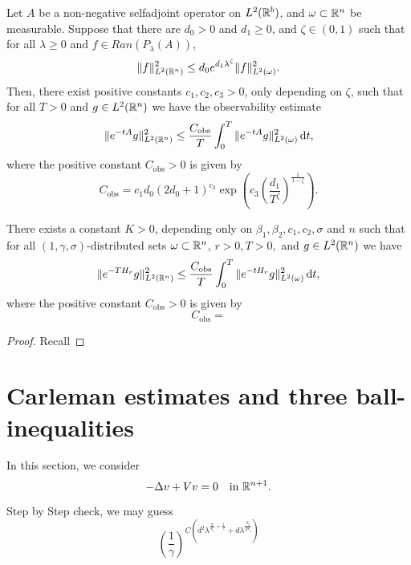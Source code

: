 \begin{theorem}
	Let $A$ be a non-negative selfadjoint operator on $L^2(\mathbb{R}^{b})$, and $\omega \subset  \mathbb{R}^{n}$ be measurable. Suppose that there are $d_0>0$ and $d_1\ge 0$, and $\zeta \in (0,1)$ such that for all $\lambda\ge 0$ and $f \in \textit{Ran} (P_\lambda(A))$,
	\[
	\|f\|_{L^2(\mathbb{R}^{n})}^2\le d_0 e^{d_1 \lambda^{\zeta }}\|f\|_{L^2(\omega)}^2.
	\]
	Then, there exist positive constants $c_1,c_2,c_3>0$, only depending on $\zeta $, such that for all $T>0$ and $g\in L^2(\mathbb{R}^{n})$ we have the observability estimate
	\[
	\|e^{-tA}g\|^2_{L^2(\mathbb{R}^{n})}\le \frac{C_{\mathrm{obs}}}{T}\int_0^{T}\|e^{-tA}g\|^2_{L^2(\omega)}\,\mathrm{d} t,
	\] 
	where the positive constant $C_{\mathrm{obs}}>0$ is given by
	\begin{equation}
		 C_{\mathrm{obs}}=c_1d_0 (2d_0+1)^{c_2}\exp \left( c_3 \left( \frac{d_1}{T^{\zeta }} \right) ^{\frac{1}{1-\zeta }} \right). 
	\end{equation}
\end{theorem}

\begin{proposition}
	There exists a constant $K>0$, depending only on $\beta_1,\beta_2,c_1,c_2,\sigma$ and $n$ such that for all $(1,\gamma,\sigma)$-distributed sets $\omega\subset \mathbb{R}^{n}$, $r>0,T>0,$ and $g\in L^2(\mathbb{R}^{n})$ we have
	\begin{equation}
		\| e^{-TH_r}g\|^2_{L^2(\mathbb{R}^{n})}\le \frac{C_{\mathrm{obs}}}{T}\int_0^{T}\|e^{-tH_r}g\|_{L^2(\omega)}^2\,\mathrm{d} t,
	\end{equation}
	where the positive constant $C_{\mathrm{obs}}>0$ is given by 
	\begin{equation}
		C_{\mathrm{obs}}=
	\end{equation}
\end{proposition}
\begin{proof}
	Recall
\end{proof}


\iffalse
\appendix
\section{Carleman estimates and three ball-inequalities}

In this section, we consider 
\begin{equation}\label{A.1}
	-\Delta v+Vv=0 \quad \text{in } \mathbb{R}^{n+1}.
\end{equation}

Step by Step check, we may guess
\[
	\left( \frac{1}{\gamma} \right) ^{C \left( d^2 \lambda^{\frac{\sigma}{\beta _1}+\frac{1}{2}}+d \lambda^{\frac{\beta _2}{2\beta _1}} \right) }
\]

